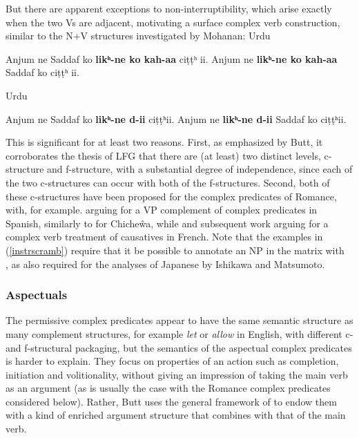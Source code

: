 \documentclass[output=paper,hidelinks]{langscibook}
\begin{document}
But there are apparent exceptions to non-interruptibility, which arise exactly
when the two Vs are adjacent, motivating a surface complex verb construction,
similar to the N+V structures investigated by Mohanan:
\ea\label{instrscramb}Urdu
\begin{xlist}
\ex Anjum ne Saddaf ko \textbf{likʰ-ne ko kah-aa} {ciṭṭʰ ii}.
\ex Anjum ne \textbf{likʰ-ne ko kah-aa} Saddaf ko {ciṭṭʰ ii}.
\end{xlist}
\z
\ea Urdu\\
\begin{xlist}
\ex Anjum ne Saddaf ko \textbf{likʰ-ne d-ii} {ciṭṭʰii}.
\ex Anjum ne \textbf{likʰ-ne d-ii} Saddaf ko {ciṭṭʰii}.
\end{xlist}
\z
This is significant for at least two reasons.  First, as emphasized by Butt, it corroborates
the thesis of LFG that there are (at least) two distinct levels, c-structure and f-structure,
with a substantial degree of independence, since each of the two c-structures can occur
with both of the f-structures.  Second, both of these c-structures have been proposed
for the complex predicates of Romance, with, for example. \citet{Manning1992} arguing
for a VP complement of complex predicates in Spanish, similarly to
\citet{alsina1996the-role} for Chiche\^wa, while \citet{Kayne1975} and subsequent work
arguing for a complex verb treatment of causatives in French.
Note that the examples in (\ref{instrscramb}) require that it be possible to annotate
an NP in the matrix with {\XCOMP~\OBJ} \citep[117, ex (19a)]{Butt1997},
as also required for the analyses of Japanese by Ishikawa and Matsumoto.

\subsubsection{Aspectuals}
The permissive complex predicates appear to have the same semantic structure as
many complement structures, for example \emph{let} or \emph{allow} in English, with
different c- and f-structural packaging, but the semantics of the aspectual complex
predicates is harder to explain.  They focus on properties of an action such
as completion, initiation and volitionality, without giving an impression of taking
the main verb as an argument (as is usually the case with the Romance complex predicates
considered below).  Rather, Butt uses the general framework of
\citet{jackendoff1990semantic} to endow them with a kind of enriched argument structure
that combines with that of the main verb.
\end{document}
